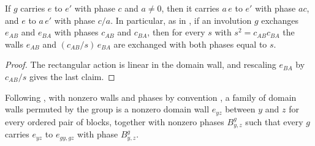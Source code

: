 \begin{lemma}
    \label{thm:mpug_domain_wall_rescaling}
    \leanok
    If $g$ carries $e$ to $e'$ with phase $c$ and $a\neq0$, then it carries $a\,e$
    to $e'$ with phase $ac$, and $e$ to $a\,e'$ with phase $c/a$. In
    particular, as in \cite[Section~III.F]{GarreRubioSchuch2024DomainWall},
    if an involution $g$ exchanges $e_{AB}$ and $e_{BA}$ with phases $c_{AB}$
    and $c_{BA}$, then for every $s$ with $s^2=c_{AB}c_{BA}$ the walls
    $e_{AB}$ and $(c_{AB}/s)\,e_{BA}$ are exchanged with both phases equal
    to $s$.
\end{lemma}

\begin{proof}\leanok
    The rectangular action is linear in the domain wall, and rescaling
    $e_{BA}$ by $c_{AB}/s$ gives the last claim.
\end{proof}

\begin{definition}
    \label{def:mpug_domain_wall_family}
    \leanok
    Following \cite[Section~IV.B]{GarreRubioSchuch2024DomainWall}, with
    nonzero walls and phases by convention
    \cite{gap:gs24_domain_wall_nondegenerate}, a family of domain walls
    permuted by the group is a nonzero domain wall $e_{yz}$ between $y$ and
    $z$ for every ordered pair of blocks, together with nonzero phases
    $B^g_{y,z}$ such that every $g$ carries $e_{yz}$ to $e_{gy,gz}$ with
    phase $B^g_{y,z}$.
\end{definition}

